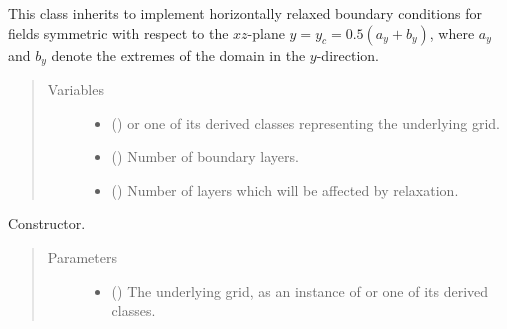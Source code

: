 \documentclass[letterpaper,10pt,english]{sphinxmanual}
\begin{document}

\begin{fulllineitems}
\label{\detokenize{api:tasmania.dycore.horizontal_boundary_relaxed.RelaxedSymmetricXZ}}
This class inherits {\hyperref[\detokenize{api:tasmania.dycore.horizontal_boundary_relaxed.Relaxed}]{}} to implement horizontally
relaxed boundary conditions for fields symmetric with respect to the \(xz\)-plane \(y = y_c = 0.5 (a_y + b_y)\),
where \(a_y\) and \(b_y\) denote the extremes of the domain in the \(y\)-direction.
\begin{quote}\begin{description}
\item[{Variables}] \leavevmode\begin{itemize}
\item {} 
 () \textendash{} {\hyperref[\detokenize{api:tasmania.grids.grid_xyz.GridXYZ}]{}} or one of its derived classes representing the underlying grid.

\item {} 
{\hyperref[\detokenize{api:tasmania.dycore.prognostic_isentropic.PrognosticIsentropic.nb}]{}} () \textendash{} Number of boundary layers.

\item {} 
 () \textendash{} Number of layers which will be affected by relaxation.

\end{itemize}

\end{description}\end{quote}

\begin{fulllineitems}
\label{\detokenize{api:tasmania.dycore.horizontal_boundary_relaxed.RelaxedSymmetricXZ.__init__}}
Constructor.
\begin{quote}\begin{description}
\item[{Parameters}] \leavevmode\begin{itemize}
\item {} 
 () \textendash{} The underlying grid, as an instance of {\hyperref[\detokenize{api:tasmania.grids.grid_xyz.GridXYZ}]{}} or one of its derived classes.


\end{itemize}
\end{description}
\end{quote}
\end{fulllineitems}
\end{fulllineitems}
\end{document}
